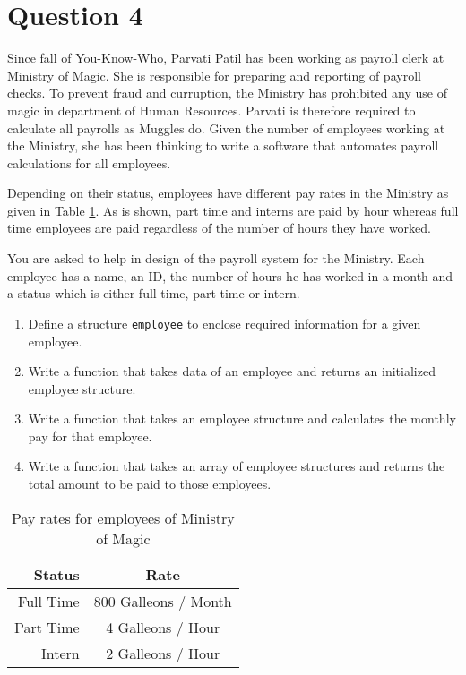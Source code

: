 
\section*{Question 4}

Since fall of You-Know-Who, Parvati Patil has been working as payroll clerk at Ministry of Magic.
She is responsible for preparing and reporting of payroll checks.
To prevent fraud and curruption, the Ministry has prohibited any use of magic in department of Human Resources.
Parvati is therefore required to calculate all payrolls as Muggles do.
Given the number of employees working at the Ministry, she has been thinking to write a software that automates payroll calculations for all employees.

Depending on their status, employees have different pay rates in the Ministry as given in Table \ref{tablequestion5}.
As is shown, part time and interns are paid by hour whereas full time employees are paid regardless of the number of hours they have worked.

You are asked to help in design of the payroll system for the Ministry.
Each employee has a name, an ID, the number of hours he has worked in a month and a status which is either full time, part time or intern.

\begin{enumerate}
\item Define a structure \texttt{employee} to enclose required information for a given employee.
\item Write a function that takes data of an employee and returns an initialized employee structure.
\item Write a function that takes an employee structure and calculates the monthly pay for that employee.
\item Write a function that takes an array of employee structures and returns the total amount to be paid to those employees.
\end{enumerate}

\begin{table}[H] \centering
\begin{tabular}{r c}
\textbf{Status} & \textbf{Rate}\\
\hline
Full Time & 800 Galleons / Month\\
Part Time & 4 Galleons / Hour\\
Intern & 2 Galleons / Hour
\end{tabular}
\caption{Pay rates for employees of Ministry of Magic}
\label{tablequestion5}
\end{table}

